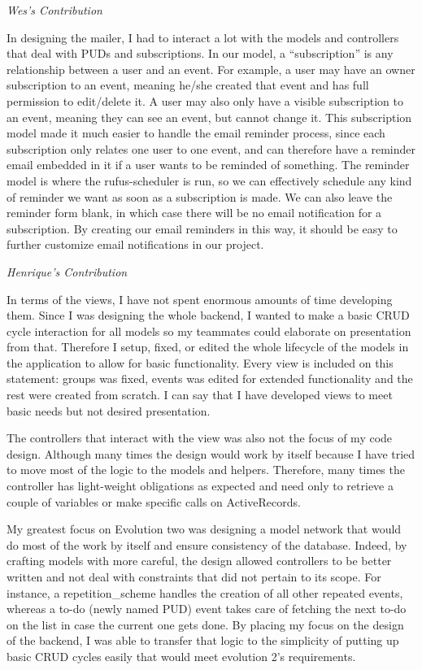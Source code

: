 \documentclass[11pt]{article}
\begin{document}
\textit{Wes's Contribution}

In designing the mailer, I had to interact a lot with the models and controllers that deal with PUDs and subscriptions.  In our model, a “subscription” is any relationship between a user and an event.  For example, a user may have an owner subscription to an event, meaning he/she created that event and has full permission to edit/delete it.  A user may also only have a visible subscription to an event, meaning they can see an event, but cannot change it.  This subscription model made it much easier to handle the email reminder process, since each subscription only relates one user to one event, and can therefore have a reminder email embedded in it if a user wants to be reminded of something.  The reminder model is where the rufus-scheduler is run, so we can effectively schedule any kind of reminder we want as soon as a subscription is made.  We can also leave the reminder form blank, in which case there will be no email notification for a subscription.  By creating our email reminders in this way, it should be easy to further customize email notifications in our project.

\textit{Henrique's Contribution}

In terms of the views, I have not spent enormous amounts of time developing them. Since I was designing the whole backend, I wanted to make a basic CRUD cycle interaction for all models so my teammates could elaborate on presentation from that. Therefore I setup, fixed, or edited the whole lifecycle of the models in the application to allow for basic functionality. Every view is included on this statement: groups was fixed, events was edited for extended functionality and the rest were created from scratch. I can say that I have developed views to meet basic needs but not desired presentation.

The controllers that interact with the view was also not the focus of my code design. Although many times the design would work by itself because I have tried to move most of the logic to the models and helpers. Therefore, many times the controller has light-weight obligations as expected and need only to retrieve a couple of variables or make specific calls on ActiveRecords.

My greatest focus on Evolution two was designing a model network that would do most of the work by itself and ensure consistency of the database. Indeed, by crafting models with more careful, the design allowed controllers to be better written and not deal with constraints that did not pertain to its scope. For instance, a repetition\_scheme handles the creation of all other repeated events, whereas a to-do (newly named PUD) event takes care of fetching the next to-do on the list in case the current one gets done. By placing my focus on the design of the backend, I was able to transfer that logic to the simplicity of putting up basic CRUD cycles easily that would meet evolution 2’s requirements.
\end{document}
